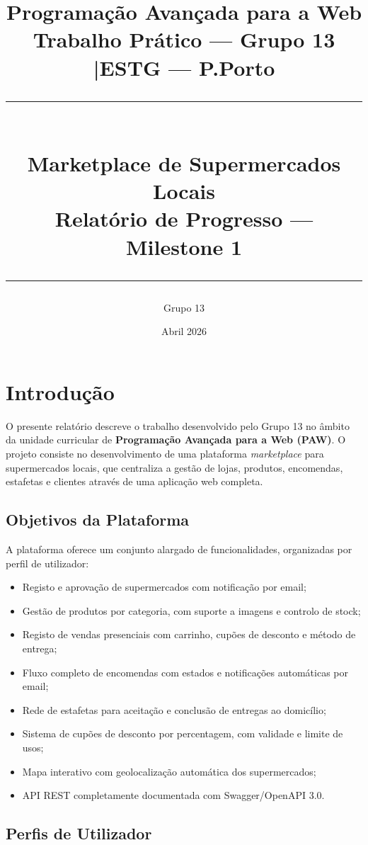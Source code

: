 \documentclass[12pt,a4paper]{article}
\title{
  \vspace{-1cm}
  \Large \textbf{Programação Avançada para a Web}\\[0.4cm]
  \large Trabalho Prático --- Grupo 13 \quad|\quad ESTG --- P.Porto\\[0.2cm]
  \rule{\linewidth}{1pt}\\[0.4cm]
  \LARGE \textbf{Marketplace de Supermercados Locais}\\[0.3cm]
  \large Relatório de Progresso --- Milestone 1\\[0.2cm]
  \rule{\linewidth}{1pt}
}
\author{Grupo 13}
\date{Abril 2026}
\begin{document}
\maketitle
\thispagestyle{empty}
\newpage

\tableofcontents
\newpage

\section{Introdução}

O presente relatório descreve o trabalho desenvolvido pelo Grupo 13 no âmbito da unidade curricular de \textbf{Programação Avançada para a Web (PAW)}. O projeto consiste no desenvolvimento de uma plataforma \textit{marketplace} para supermercados locais, que centraliza a gestão de lojas, produtos, encomendas, estafetas e clientes através de uma aplicação web completa.

\subsection{Objetivos da Plataforma}

A plataforma oferece um conjunto alargado de funcionalidades, organizadas por perfil de utilizador:

\begin{itemize}[leftmargin=*, label=\textcolor{primaryblue}{\textbullet}]
  \item Registo e aprovação de supermercados com notificação por email;
  \item Gestão de produtos por categoria, com suporte a imagens e controlo de stock;
  \item Registo de vendas presenciais com carrinho, cupões de desconto e método de entrega;
  \item Fluxo completo de encomendas com estados e notificações automáticas por email;
  \item Rede de estafetas para aceitação e conclusão de entregas ao domicílio;
  \item Sistema de cupões de desconto por percentagem, com validade e limite de usos;
  \item Mapa interativo com geolocalização automática dos supermercados;
  \item API REST completamente documentada com Swagger/OpenAPI 3.0.
\end{itemize}

\subsection{Perfis de Utilizador}
\end{document}
